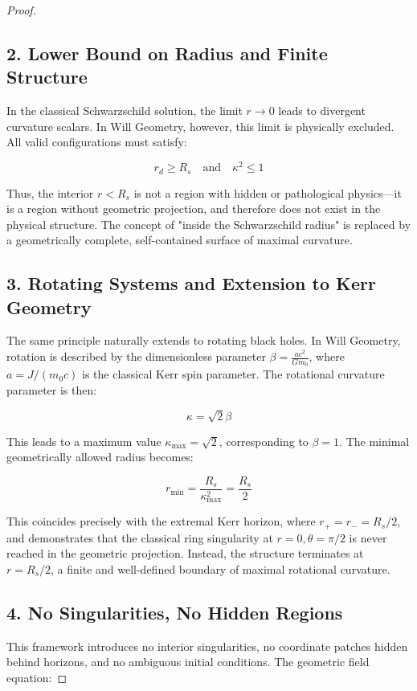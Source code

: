 \documentclass{article}
\begin{document}
\begin{proof}
\subsection*{2. Lower Bound on Radius and Finite Structure}

In the classical Schwarzschild solution, the limit \( r \to 0 \) leads to divergent curvature scalars. In Will Geometry, however, this limit is physically excluded. All valid configurations must satisfy:

\[
r_{d} \geq R_s \quad \text{and} \quad \kappa^2 \leq 1
\]

Thus, the interior \( r < R_s \) is not a region with hidden or pathological physics—it is a region without geometric projection, and therefore does not exist in the physical structure. The concept of "inside the Schwarzschild radius" is replaced by a geometrically complete, self-contained surface of maximal curvature.

\subsection*{3. Rotating Systems and Extension to Kerr Geometry}

The same principle naturally extends to rotating black holes. In Will Geometry, rotation is described by the dimensionless parameter \( \beta = \frac{ac^2}{Gm_0} \), where \( a = J / (m_0 c) \) is the classical Kerr spin parameter. The rotational curvature parameter is then:

\[
\kappa = \sqrt{2} \beta
\]

This leads to a maximum value \( \kappa_{\text{max}} = \sqrt{2} \), corresponding to \( \beta = 1 \). The minimal geometrically allowed radius becomes:

\[
r_{\text{min}} = \frac{R_s}{\kappa_{\text{max}}^2} = \frac{R_s}{2}
\]

This coincides precisely with the extremal Kerr horizon, where \( r_+ = r_- = R_s / 2 \), and demonstrates that the classical ring singularity at \( r = 0, \theta = \pi/2 \) is never reached in the geometric projection. Instead, the structure terminates at \( r = R_s / 2 \), a finite and well-defined boundary of maximal rotational curvature.

\subsection*{4. No Singularities, No Hidden Regions}

This framework introduces no interior singularities, no coordinate patches hidden behind horizons, and no ambiguous initial conditions. The geometric field equation:


\end{proof}
\end{document}
